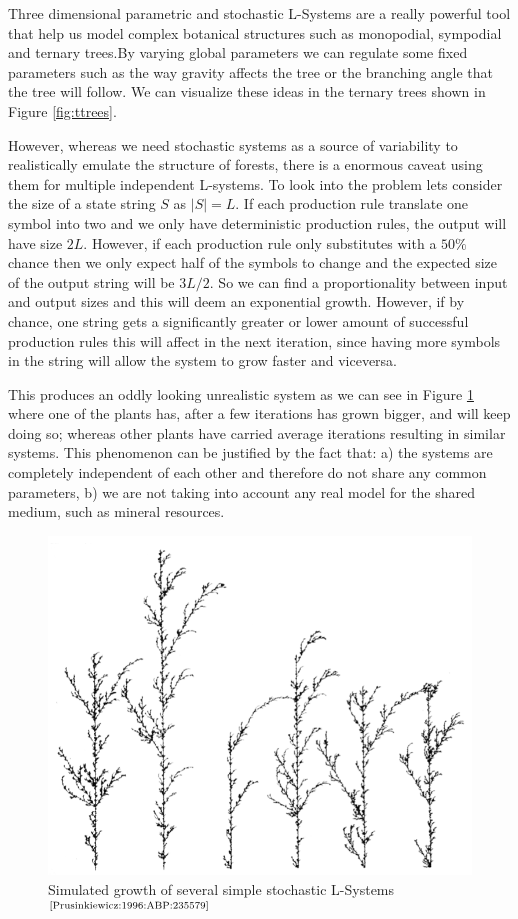 \documentclass[letterpaper,twoside,11pt]{article}
\begin{document}
\begin{multicols}{2}
\label{sec:interdependence}

Three dimensional parametric and stochastic L-Systems are a really powerful tool that help us model complex botanical structures such as monopodial, sympodial and ternary trees.By varying global parameters we can regulate some fixed parameters such as the way gravity affects the tree or the branching angle that the tree will follow. We can visualize these ideas in the ternary trees shown in Figure \ref{fig:ttrees}.

However, whereas we need stochastic systems as a source of variability to realistically emulate the structure of forests, there is a enormous caveat using them for multiple independent L-systems. To look into the problem lets consider the size of a state string $S$ as $|S| = L$. If each production rule translate one symbol into two and we only have deterministic production rules, the output will have size $2L$. However, if each production rule only substitutes with a $50\%$ chance then we only expect half of the symbols to change and the expected size of the output string will be $3L/2$. So we can find a proportionality between input and output sizes and this will deem an exponential growth. However, if by chance, one string gets a significantly greater or lower amount of successful production rules this will affect in the next iteration, since having more symbols in the string will allow the system to grow faster and viceversa.

This produces an oddly looking unrealistic system as we can see in Figure \ref{fig:stochas} where one of the plants has, after a few iterations has grown bigger, and will keep doing so; whereas other plants have carried average iterations resulting in similar systems. This phenomenon can be justified by the fact that: a) the systems are completely independent of each other and therefore do not share any common parameters, b) we are not taking into account any real model for the shared medium, such as mineral resources.

\begin{figure}[H]
    \includegraphics[width=.5\textwidth]{stochastic.png}
    \caption{Simulated growth of several simple stochastic L-Systems$^{\text{\cite{Prusinkiewicz:1996:ABP:235579}}}$}
    \label{fig:stochas}
\end{figure}


\end{multicols}
\end{document}
